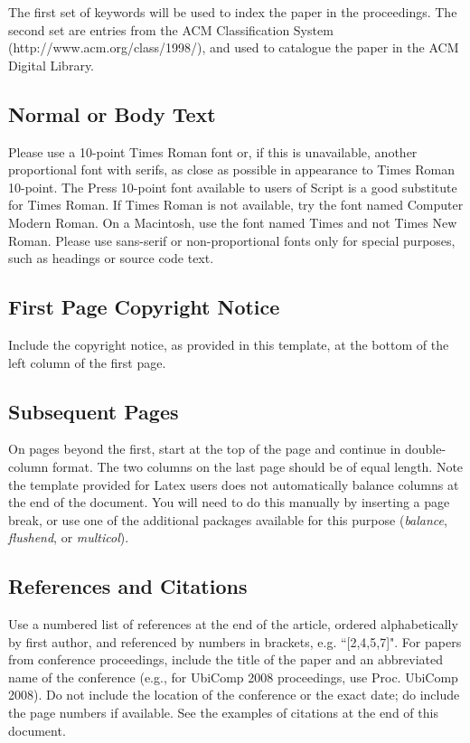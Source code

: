 \documentclass{ubicomp2010}
\begin{document}
The first set of keywords will be used to index the paper in the
proceedings. The second set are entries from the ACM Classification
System
(http://www.acm.org/class/1998/), and used to catalogue the paper in the ACM
Digital Library.

\subsection{Normal or Body Text}

Please use a 10-point Times Roman font or, if this is unavailable,
another proportional font with serifs, as close as possible in
appearance to Times Roman 10-point. The Press 10-point font available
to users of Script is a good substitute for Times Roman. If Times
Roman is not available, try the font named Computer Modern Roman. On a
Macintosh, use the font named Times and not Times New Roman. Please
use sans-serif or non-proportional fonts only for special purposes,
such as headings or source code text.

\subsection{First Page Copyright Notice}

Include the copyright notice, as provided in this template, at the bottom of the left column of the first page.
\subsection{Subsequent Pages}

On pages beyond the first, start at the top of the page and continue
in double-column format.  The two columns on the last page should be
of equal length. Note the template provided for Latex users does not automatically balance columns at the end of the document. You will need to do this manually by inserting a page break, or use one of the additional packages available for this purpose (\emph{balance}, \emph{flushend}, or \emph{multicol}).

\subsection{References and Citations}

Use a numbered list of references at the end of the article, ordered
alphabetically by first author, and referenced by numbers in brackets, e.g.
``[2,4,5,7]". For papers from conference proceedings, include the title
of the paper and an abbreviated name of the conference (e.g., for
UbiComp 2008 proceedings, use Proc. UbiComp 2008). Do not include
the location of the conference or the exact date; do include the page
numbers if available. See the examples of citations at the end of this
document.
\end{document}

